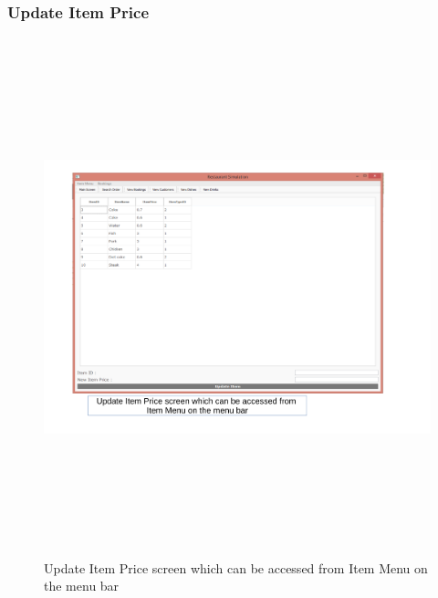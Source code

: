 \begin{landscape}
\subsubsection{Update Item Price}
\begin{figure}[H]
    \includegraphics[height = 15cm]{./Maintenance/images/screen7}
    \caption{Update Item Price screen which can be accessed from Item Menu on the menu bar} \label{fig:screen7}
\end{figure}


\end{landscape}
